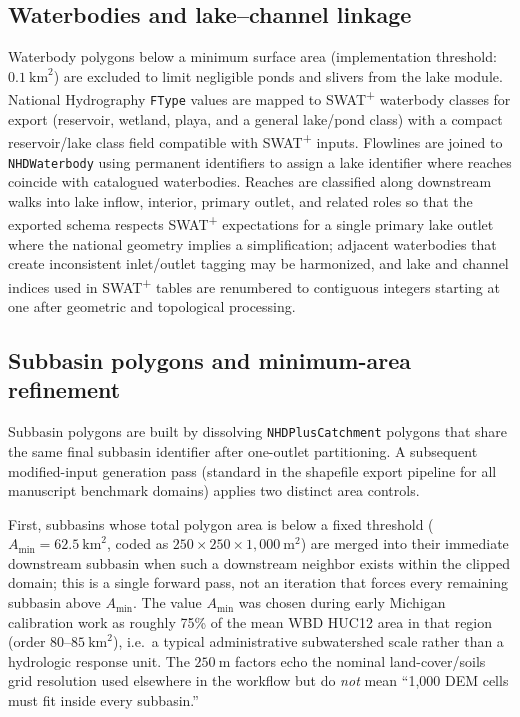 \subsection{Waterbodies and lake--channel linkage}
Waterbody polygons below a minimum surface area (implementation threshold: $0.1~\mathrm{km}^2$) are excluded to limit negligible ponds and slivers from the lake module.
National Hydrography \texttt{FType} values are mapped to SWAT\textsuperscript{+} waterbody classes for export (reservoir, wetland, playa, and a general lake/pond class) with a compact reservoir/lake class field compatible with SWAT\textsuperscript{+} inputs.
Flowlines are joined to \texttt{NHDWaterbody} using permanent identifiers to assign a lake identifier where reaches coincide with catalogued waterbodies.
Reaches are classified along downstream walks into lake inflow, interior, primary outlet, and related roles so that the exported schema respects SWAT\textsuperscript{+} expectations for a single primary lake outlet where the national geometry implies a simplification; adjacent waterbodies that create inconsistent inlet/outlet tagging may be harmonized, and lake and channel indices used in SWAT\textsuperscript{+} tables are renumbered to contiguous integers starting at one after geometric and topological processing.

\subsection{Subbasin polygons and minimum-area refinement}
Subbasin polygons are built by dissolving \texttt{NHDPlusCatchment} polygons that share the same final subbasin identifier after one-outlet partitioning.
A subsequent modified-input generation pass (standard in the shapefile export pipeline for all manuscript benchmark domains) applies two distinct area controls.

First, subbasins whose total polygon area is below a fixed threshold ($A_{\min}=62.5~\mathrm{km}^2$, coded as $250\times250\times1{,}000~\mathrm{m}^2$) are merged into their immediate downstream subbasin when such a downstream neighbor exists within the clipped domain; this is a single forward pass, not an iteration that forces every remaining subbasin above $A_{\min}$.
The value $A_{\min}$ was chosen during early Michigan calibration work as roughly 75\% of the mean WBD HUC12 area in that region (order $80$--$85~\mathrm{km}^2$), i.e.\ a typical administrative subwatershed scale rather than a hydrologic response unit.
The $250~\mathrm{m}$ factors echo the nominal land-cover/soils grid resolution used elsewhere in the workflow but do \emph{not} mean ``1{,}000 DEM cells must fit inside every subbasin.''

